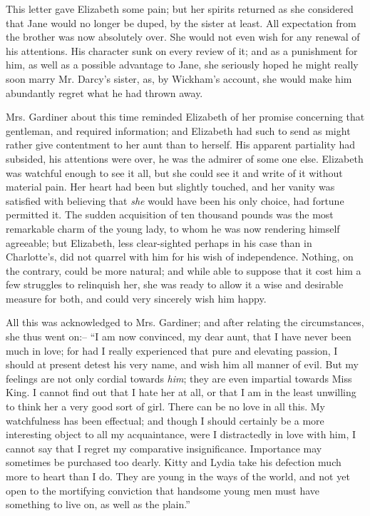 This letter gave Elizabeth some pain; but her spirits
returned as she considered that Jane would no longer be
duped, by the sister at least. All expectation from the
brother was now absolutely over. She would not even
wish for any renewal of his attentions. His character
sunk on every review of it; and as a punishment for
him, as well as a possible advantage to Jane, she seriously
hoped he might really soon marry Mr. Darcy’s sister, as,
by Wickham’s account, she would make him abundantly
regret what he had thrown away.

Mrs. Gardiner about this time reminded Elizabeth of
her promise concerning that gentleman, and required
information; and Elizabeth had such to send as might
rather give contentment to her aunt than to herself.
His apparent partiality had subsided, his attentions were
over, he was the admirer of some one else. Elizabeth
was watchful enough to see it all, but she could see it
and write of it without material pain. Her heart had
been but slightly touched, and her vanity was satisfied
with believing that \textit{she} would have been his only choice,
had fortune permitted it. The sudden acquisition of ten
thousand pounds was the most remarkable charm of the
young lady, to whom he was now rendering himself agreeable;
but Elizabeth, less clear-sighted perhaps in his
case than in Charlotte’s, did not quarrel with him for his
wish of independence. Nothing, on the contrary, could
be more natural; and while able to suppose that it cost
him a few struggles to relinquish her, she was ready to
allow it a wise and desirable measure for both, and could
very sincerely wish him happy.

All this was acknowledged to Mrs. Gardiner; and after
relating the circumstances, she thus went on:-- “I am
now convinced, my dear aunt, that I have never been much
in love; for had I really experienced that pure and
elevating passion, I should at present detest his very
name, and wish him all manner of evil. But my feelings
are not only cordial towards \textit{him}; they are even impartial
towards Miss King. I cannot find out that I hate her
at all, or that I am in the least unwilling to think her
a very good sort of girl. There can be no love in all this.
My watchfulness has been effectual; and though I should
certainly be a more interesting object to all my acquaintance,
were I distractedly in love with him, I cannot say
that I regret my comparative insignificance. Importance
may sometimes be purchased too dearly. Kitty and Lydia
take his defection much more to heart than I do. They are
young in the ways of the world, and not yet open to the
mortifying conviction that handsome young men must
have something to live on, as well as the plain.”


